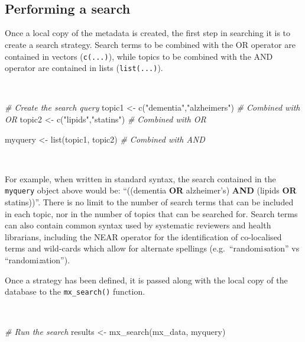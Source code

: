 \documentclass[a4paper, twoside]{templates/ociamthesis}
\newenvironment{Shaded}{\begin{snugshade}}{\end{snugshade}}
\newcommand{\CommentTok}[1]{\textcolor[rgb]{0.56,0.35,0.01}{\textit{#1}}}
\newcommand{\FunctionTok}[1]{\textcolor[rgb]{0.00,0.00,0.00}{#1}}
\newcommand{\NormalTok}[1]{#1}
\newcommand{\OtherTok}[1]{\textcolor[rgb]{0.56,0.35,0.01}{#1}}
\newcommand{\StringTok}[1]{\textcolor[rgb]{0.31,0.60,0.02}{#1}}
\renewenvironment{Shaded}
{
  \vspace{4pt}%
  \begin{snugshade}%
}{%
  \end{snugshade}%
  \vspace{4pt}%
}
\begin{document}
~

~

\hypertarget{performing-a-search}{%
\subsection{Performing a search}\label{performing-a-search}}

Once a local copy of the metadata is created, the first step in searching it is to create a search strategy. Search terms to be combined with the OR operator are contained in vectors (\texttt{c(...)}), while topics to be combined with the AND operator are contained in lists (\texttt{list(...)}).

~

\begin{Shaded}
\begin{Highlighting}[]
\CommentTok{\# Create the search query}
\NormalTok{topic1  }\OtherTok{\textless{}{-}} \FunctionTok{c}\NormalTok{(}\StringTok{"dementia"}\NormalTok{,}\StringTok{"alzheimer\textquotesingle{}s"}\NormalTok{)  }\CommentTok{\# Combined with OR}
\NormalTok{topic2  }\OtherTok{\textless{}{-}} \FunctionTok{c}\NormalTok{(}\StringTok{"lipids"}\NormalTok{,}\StringTok{"statins"}\NormalTok{)        }\CommentTok{\# Combined with OR}

\NormalTok{myquery }\OtherTok{\textless{}{-}} \FunctionTok{list}\NormalTok{(topic1, topic2)         }\CommentTok{\# Combined with AND}
\end{Highlighting}
\end{Shaded}

~

For example, when written in standard syntax, the search contained in the \texttt{myquery} object above would be: ``((dementia \textbf{OR} alzheimer's) \textbf{AND} (lipids \textbf{OR} statins))''. There is no limit to the number of search terms that can be included in each topic, nor in the number of topics that can be searched for. Search terms can also contain common syntax used by systematic reviewers and health librarians, including the NEAR operator for the identification of co-localised terms and wild-cards which allow for alternate spellings (e.g.~``randomi\emph{s}ation'' vs ``randomi\emph{z}ation'').

Once a strategy has been defined, it is passed along with the local copy of the database to the \texttt{mx\_search()} function.

~

\begin{Shaded}
\begin{Highlighting}[]
\CommentTok{\# Run the search}
\NormalTok{results }\OtherTok{\textless{}{-}} \FunctionTok{mx\_search}\NormalTok{(mx\_data,}
\NormalTok{                     myquery)}
\end{Highlighting}
\end{Shaded}
\end{document}
